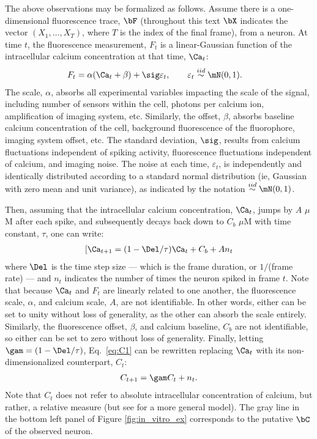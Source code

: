 The above observations may be formalized as follows. Assume there is a one-dimensional fluorescence trace, $\bF$ (throughout this text $\bX$ indicates the vector $(X_1, \ldots, X_T)$, where $T$ is the index of the final frame), from a neuron.  At time $t$, the fluorescence measurement, $F_t$ is a linear-Gaussian function of the intracellular calcium concentration at that time, $\Ca_t$:
\begin{align} \label{eq:F}
F_t &= \alpha (\Ca_t + \beta) + \sig \varepsilon_t, \qquad \varepsilon_t \overset{iid}{\sim} \mN(0,1).
\end{align}
\noindent The scale, $\alpha$, absorbs all experimental variables impacting the scale of the signal, including number of sensors within the cell, photons per calcium ion, amplification of imaging system, etc.  Similarly, the offset, $\beta$, absorbs baseline calcium concentration of the cell, background fluorescence of the fluorophore, imaging system offset, etc.  The standard deviation, $\sig$, results from calcium fluctuations independent of spiking activity, fluorescence fluctuations independent of calcium, and imaging noise. The noise at each time, $\varepsilon_t$, is independently and identically distributed according to a standard normal distribution (ie, Gaussian with zero mean and unit variance), as indicated by the notation $\overset{iid}{\sim}\mN(0,1)$. 

Then, assuming that the intracellular calcium concentration, $\Ca_t$, jumps by $A$ $\mu$M after each spike, and subsequently decays back down to $C_b$ $\mu$M with time constant, $\tau$, one can write:
\begin{align} \label{eq:C1}
[\Ca_{t+1} = (1- \Del/\tau ) \Ca_t + C_b + A n_t
\end{align}
\noindent where $\Del$ is the time step size --- which is the frame duration, or $1/$(frame rate) --- and $n_t$ indicates the number of times the neuron spiked in frame $t$. %
Note that because $\Ca_t$ and $F_t$ are linearly related to one another, the fluorescence scale, $\alpha$, and calcium scale, $A$, are not identifiable.  In other words, either can be set to unity without loss of generality, as the other can absorb the scale entirely. Similarly, the fluorescence offset, $\beta$, and calcium baseline, $C_b$ are not identifiable, so either can be set to zero without loss of generality.  Finally, letting $\gam=(1-\Del/\tau)$, Eq.~\eqref{eq:C1} can be rewritten replacing $\Ca_t$ with its non-dimensionalized counterpart, $C_t$: 
\begin{align} \label{eq:C2}
	 C_{t+1}=\gam C_t + n_t.
\end{align} 
\noindent Note that $C_t$ does not refer to absolute intracellular concentration of calcium, but rather, a relative measure (but see \cite{VogelsteinPaninski09} for a more general model).  The gray line in the bottom left panel of Figure \ref{fig:in_vitro_ex} corresponds to the putative $\bC$ of the observed neuron.  

